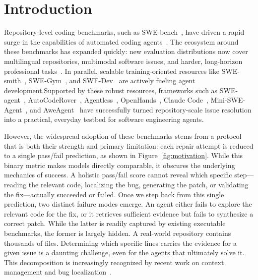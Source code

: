 \section{Introduction}



Repository-level coding benchmarks, such as SWE-bench~\citep{jimenez2024swebench}, have driven a rapid surge in the capabilities of automated coding agents~\citep{chowdhury2024swebenchverified,zhang2025swebenchgoeslive,deng2025swebenchproaiagents}. The ecosystem around these benchmarks has expanded quickly: new evaluation distributions now cover multilingual repositories, multimodal software issues, and harder, long-horizon professional tasks~\citep{yang2025swesmith,zan2025multiswebenchmultilingualbenchmarkissue,yang2025swebench,badertdinov2025swerebenchautomatedpipelinetask}. In parallel, scalable training-oriented resources like SWE-smith~\citep{yang2025swesmith}, SWE-Gym~\citep{pan2025trainingsoftwareengineeringagents}, and SWE-Dev~\citep{wang2025swedev} are actively fueling agent development.Supported by these robust resources, frameworks such as SWE-agent~\citep{yang2024sweagent}, AutoCodeRover~\citep{zhang2024autocoderover}, Agentless~\citep{xia2024agentless}, OpenHands~\citep{wang2024openhands}, Claude Code~\citep{anthropic2025claudecode}, Mini-SWE-Agent~\citep{yang2024sweagent}, and AweAgent~\citep{chen2026beyondswecurrentcodeagent} have successfully turned repository-scale issue resolution into a practical, everyday testbed for software engineering agents.

However, the widespread adoption of these benchmarks stems from a protocol that is both their strength and primary limitation: each repair attempt is reduced to a single pass/fail prediction, as shown in Figure~\ref{fig:motivation}. While this binary metric makes models directly comparable, it obscures the underlying mechanics of success. A holistic pass/fail score cannot reveal which specific step---reading the relevant code, localizing the bug, generating the patch, or validating the fix---actually succeeded or failed. Once we step back from this single prediction, two distinct failure modes emerge. An agent either fails to explore the relevant code for the fix, or it retrieves sufficient evidence but fails to synthesize a correct patch. While the latter is readily captured by existing executable benchmarks, the former is largely hidden. A real-world repository contains thousands of files. Determining which specific lines carries the evidence for a given issue is a daunting challenge, even for the agents that ultimately solve it. This decomposition is increasingly recognized by recent work on context management and bug localization~\citep{li2026contextbench,chen2025locagent,yu2025orcaloca,wang2026swepruner,zhu2026swecontextbench,suri2026codescout}.

